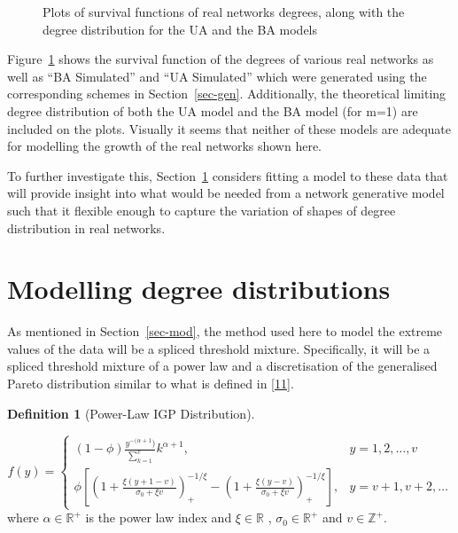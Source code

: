 \documentclass[
  10pt,
  a4paper,
]{scrreprt}
\theoremstyle{definition}
\newtheorem{definition}{Definition}[section]
\theoremstyle{plain}
\theoremstyle{plain}
\theoremstyle{plain}
\theoremstyle{remark}
\begin{document}
{\begin{figure}[H]
{}

\caption{\label{fig-survs}Plots of survival functions of real networks
degrees, along with the degree distribution for the UA and the BA
models}

\end{figure}

Figure~\ref{fig-survs} shows the survival function of the degrees of
various real networks as well as ``BA Simulated'' and ``UA Simulated''
which were generated using the corresponding schemes in
Section~\ref{sec-gen}. Additionally, the theoretical limiting degree
distribution of both the UA model and the BA model (for m=1) are
included on the plots. Visually it seems that neither of these models
are adequate for modelling the growth of the real networks shown here.

To further investigate this, Section~\ref{sec-realmodel} considers
fitting a model to these data that will provide insight into what would
be needed from a network generative model such that it flexible enough
to capture the variation of shapes of degree distribution in real
networks.

\hypertarget{sec-realmodel}{%
\section{Modelling degree distributions}\label{sec-realmodel}}

As mentioned in Section~\ref{sec-mod}, the method used here to model the
extreme values of the data will be a spliced threshold mixture.
Specifically, it will be a spliced threshold mixture of a power law and
a discretisation of the generalised Pareto distribution similar to what
is defined in {[}\protect\hyperlink{ref-Rohrbeck_2018}{11}{]}.

\begin{definition}[Power-Law IGP
Distribution]\protect\hypertarget{def-pligp}{}\label{def-pligp}

\[
f(y) = \begin{cases}
(1-\phi)\displaystyle\frac{y^{-(\alpha+1})}{\sum_{k=1}^v}k^{\alpha+1}, & y=1,2,\ldots, v\\
\phi\left[\left(1+\displaystyle\frac{\xi(y+1-v)}{\sigma_0+\xi v}\right)_+^{-1/\xi}-\left(1+\displaystyle\frac{\xi(y-v)}{\sigma_0+\xi v}\right)_+^{-1/\xi}\right],&y=v+1, v+2,\ldots
\end{cases}
\] where \(\alpha\in\mathbb R^+\) is the power law index and
\(\xi \in \mathbb R\) , \(\sigma_0 \in \mathbb R^+\) and
\(v\in\mathbb Z^+.\)


\end{definition}}
\end{document}
